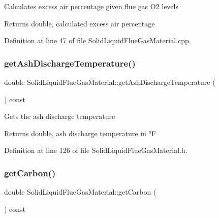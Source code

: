Calculates excess air percentage given flue gas O2 levels \begin{DoxyReturn}{Returns}
double, calculated excess air percentage 
\end{DoxyReturn}


Definition at line 47 of file Solid\+Liquid\+Flue\+Gas\+Material.\+cpp.

\mbox{\label{class_solid_liquid_flue_gas_material_ab233d4e27397cc74fbe2d3084e4e6f7c}} 
\subsubsection{\texorpdfstring{get\+Ash\+Discharge\+Temperature()}{getAshDischargeTemperature()}}
{\footnotesize\ttfamily double Solid\+Liquid\+Flue\+Gas\+Material\+::get\+Ash\+Discharge\+Temperature (\begin{DoxyParamCaption}{ }\end{DoxyParamCaption}) const\hspace{0.3cm}{\ttfamily [inline]}}

Gets the ash discharge temperature \begin{DoxyReturn}{Returns}
double, ash discharge temperature in °F 
\end{DoxyReturn}


Definition at line 126 of file Solid\+Liquid\+Flue\+Gas\+Material.\+h.

\mbox{\label{class_solid_liquid_flue_gas_material_a7b8a98111943d30094e2d6950f7f2ec1}} 
\subsubsection{\texorpdfstring{get\+Carbon()}{getCarbon()}}
{\footnotesize\ttfamily double Solid\+Liquid\+Flue\+Gas\+Material\+::get\+Carbon (\begin{DoxyParamCaption}{ }\end{DoxyParamCaption}) const\hspace{0.3cm}{\ttfamily [inline]}}

